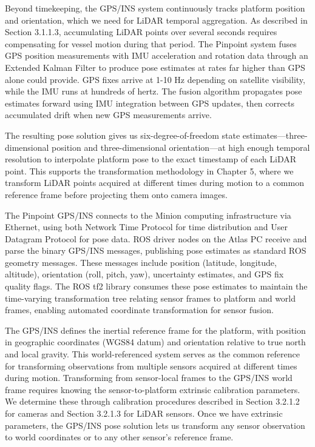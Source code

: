 \documentclass{erauthesis}
\begin{document}
Beyond timekeeping, the \ac{GPS}/\ac{INS} system continuously tracks platform position and orientation, which we need for \ac{LiDAR} temporal aggregation.
As described in Section 3.1.1.3, accumulating \ac{LiDAR} points over several seconds requires compensating for vessel motion during that period.
The Pinpoint system fuses \ac{GPS} position measurements with \ac{IMU} acceleration and rotation data through an Extended Kalman Filter to produce pose estimates at rates far higher than \ac{GPS} alone could provide.
\ac{GPS} fixes arrive at 1-10 Hz depending on satellite visibility, while the \ac{IMU} runs at hundreds of hertz.
The fusion algorithm propagates pose estimates forward using \ac{IMU} integration between \ac{GPS} updates, then corrects accumulated drift when new \ac{GPS} measurements arrive.

The resulting pose solution gives us six-degree-of-freedom state estimates—three-dimensional position and three-dimensional orientation—at high enough temporal resolution to interpolate platform pose to the exact timestamp of each \ac{LiDAR} point.
This supports the transformation methodology in Chapter 5, where we transform \ac{LiDAR} points acquired at different times during motion to a common reference frame before projecting them onto camera images.

The Pinpoint \ac{GPS}/\ac{INS} connects to the Minion computing infrastructure via Ethernet, using both Network Time Protocol for time distribution and User Datagram Protocol for pose data.
\ac{ROS} driver nodes on the Atlas PC receive and parse the binary \ac{GPS}/\ac{INS} messages, publishing pose estimates as standard \ac{ROS} geometry messages.
These messages include position (latitude, longitude, altitude), orientation (roll, pitch, yaw), uncertainty estimates, and \ac{GPS} fix quality flags.
The \ac{ROS} tf2 library consumes these pose estimates to maintain the time-varying transformation tree relating sensor frames to platform and world frames, enabling automated coordinate transformation for sensor fusion.

The \ac{GPS}/\ac{INS} defines the inertial reference frame for the platform, with position in geographic coordinates (WGS84 datum) and orientation relative to true north and local gravity.
This world-referenced system serves as the common reference for transforming observations from multiple sensors acquired at different times during motion.
Transforming from sensor-local frames to the \ac{GPS}/\ac{INS} world frame requires knowing the sensor-to-platform extrinsic calibration parameters.
We determine these through calibration procedures described in Section 3.2.1.2 for cameras and Section 3.2.1.3 for \ac{LiDAR} sensors.
Once we have extrinsic parameters, the \ac{GPS}/\ac{INS} pose solution lets us transform any sensor observation to world coordinates or to any other sensor's reference frame.
\end{document}
